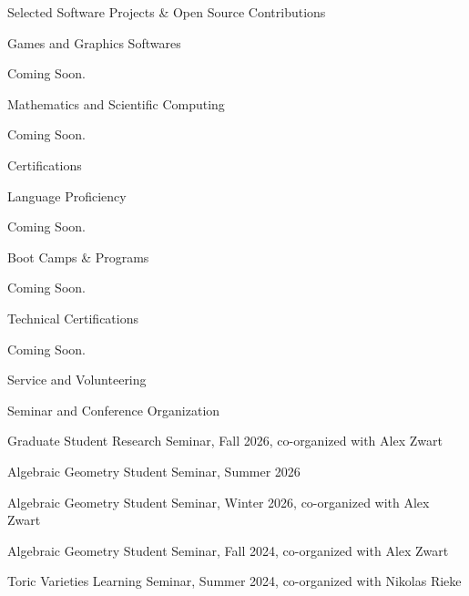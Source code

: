 \documentclass{resume}
\begin{document}
\begin{rSection}{Selected Software Projects \& Open Source Contributions} \itemsep -3pt
    \begin{rSubsection}{Games and Graphics Softwares}{}{}{}
        \item Coming Soon.
    \end{rSubsection}
    \begin{rSubsection}{Mathematics and Scientific Computing}{}{}{}
        \item Coming Soon.
    \end{rSubsection}
\end{rSection}

\begin{rSection}{Certifications} \itemsep -3pt
    \begin{rSubsection}{Language Proficiency}{}{}{}
        \item Coming Soon.
    \end{rSubsection}
    \begin{rSubsection}{Boot Camps \& Programs}{}{}{}
        \item Coming Soon.
    \end{rSubsection}
    \begin{rSubsection}{Technical Certifications}{}{}{}
        \item Coming Soon.
    \end{rSubsection}
\end{rSection}

\begin{rSection}{Service and Volunteering} \itemsep -3pt
\begin{rSubsection}{Seminar and Conference Organization}{}{}{}
        \item Graduate Student Research Seminar, Fall 2026, co-organized with Alex Zwart
        \item Algebraic Geometry Student Seminar, Summer 2026
        \item Algebraic Geometry Student Seminar, Winter 2026, co-organized with Alex Zwart
        \item Algebraic Geometry Student Seminar, Fall 2024, co-organized with Alex Zwart
        \item Toric Varieties Learning Seminar, Summer 2024, co-organized with Nikolas Rieke
    \end{rSubsection}
\end{rSection}
\vspace{0.25em}
\end{document}
